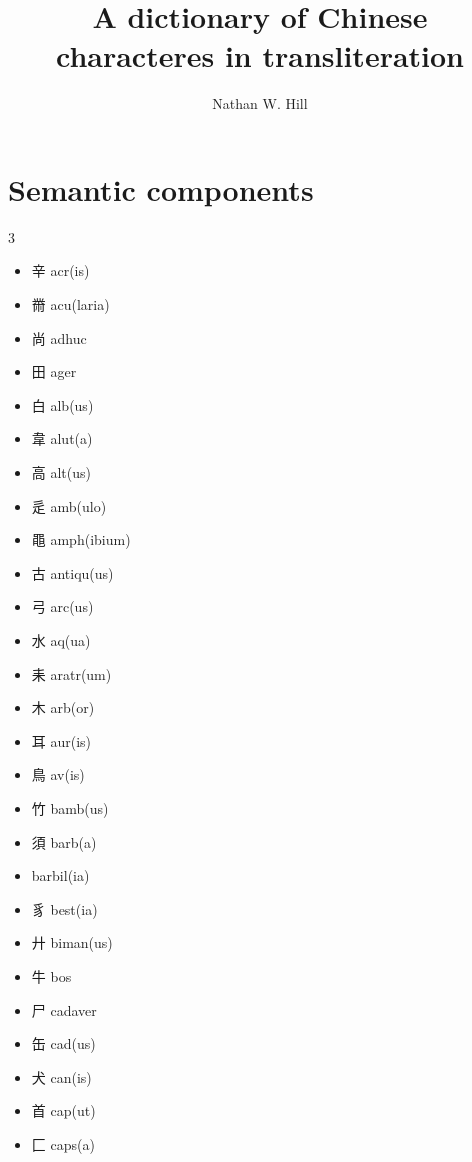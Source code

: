 \documentclass[xetex, svgnames, 12pt]{scrartcl}
\title{A dictionary of Chinese characteres in transliteration}
\author{Nathan W. Hill}
\begin{document}
\maketitle
\begin{abstract}
\noindent 
\end{abstract}


\section{Semantic components}
\begin{multicols}{3}
\begin{itemize}[noitemsep]
    \item 辛 acr(is)
    \item 黹 acu(laria)
    \item 尚 
    adhuc 
    \item 田 ager 
    \item 白 alb(us) 
    \item 韋 alut(a)
    \item 高 alt(us) 
    \item 辵 amb(ulo)
    \item 黽 amph(ibium)
    \item 古 
    antiqu(us) 
    \item 弓 
    arc(us) 
    \item 水 aq(ua) 
    \item 耒 
    aratr(um) 
    \item 木 arb(or) 
    \item 耳 aur(is) 
    \item 鳥 av(is)
    \item 竹 bamb(us)
    \item 須 barb(a)
    \item {}
barbil(ia)
    \item 豸 best(ia) 
    \item 廾 biman(us)
    \item 牛 bos 
    \item 尸 cadaver
    \item 缶 cad(us)
    \item 犬 can(is) 
    \item 首 cap(ut) 
    \item 匚 caps(a)

\end{itemize}
\end{multicols}
\end{document}
